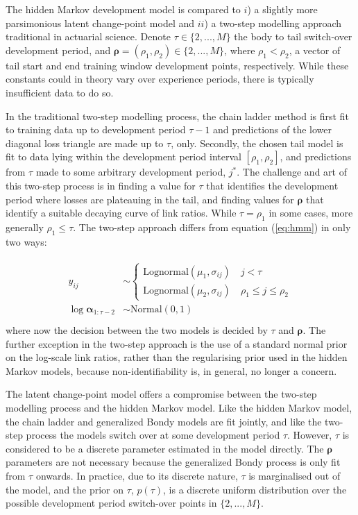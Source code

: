 The hidden Markov development model is compared to
$i$) a slightly more parsimonious latent change-point
model and $ii$) a two-step modelling approach traditional
in actuarial science.
Denote $\tau \in \{2, ..., M\}$ the body to tail
switch-over development period, and
$\bm{\rho} = (\rho_{1}, \rho_{2}) \in \{2, ..., M\}$,
where $\rho_{1} < \rho_{2}$,
a vector of tail start and end training window
development points, respectively.
While these constants could in theory vary over
experience periods, there is typically insufficient
data to do so.

In the traditional two-step modelling process,
the chain ladder
method is first fit to training data up
to development period $\tau - 1$ and
predictions of the lower diagonal loss
triangle are made up to $\tau$, only.
Secondly, the chosen tail model is fit to data
lying within the development period
interval $[\rho_{1}, \rho_{2}]$,
and predictions from $\tau$ made to 
some arbitrary development period, $j^{*}$.
The challenge and art of this two-step process
is in finding a value for $\tau$ that
identifies the development period where
losses are plateauing in the tail,
and finding values for $\bm{\rho}$ that
identify a suitable decaying curve of link ratios.
While $\tau = \rho_{1}$ in some cases,
more generally $\rho_{1} \leq \tau$.
The two-step approach differs from
equation (\ref{eq:hmm}) in only two
ways:

\begin{align}
\begin{split}
	y_{ij} &\sim 
	\begin{cases}
		\mathrm{Lognormal}(\mu_{1}, \sigma_{ij}) \quad j < \tau\\
		\mathrm{Lognormal}(\mu_{2}, \sigma_{ij}) \quad \rho_{1} \leq j \leq \rho_{2}
	\end{cases}\\
	\log \bm{\alpha}_{1:\tau - 2} &\sim \mathrm{Normal}(0, 1)\\
\end{split}
\end{align}
%
where now the decision between the two
models is decided by $\tau$ and $\bm{\rho}$.
The further exception in the two-step approach
is the use of a standard normal prior
on the log-scale link ratios, rather than the
regularising prior used in the hidden Markov models,
because non-identifiability is, in general,
no longer a concern.

The latent change-point model offers a compromise
between the two-step modelling process
and the hidden Markov model.
Like the hidden Markov model, the chain ladder
and generalized Bondy models are fit jointly, 
and like the two-step process the models
switch over at some development period
$\tau$. However,
$\tau$ is considered to be a
discrete parameter estimated
in the model directly.
The $\bm{\rho}$ parameters are not necessary
because the generalized Bondy process is
only fit from $\tau$ onwards.
In practice, due to its discrete nature,
$\tau$ is marginalised out of the model,
and the prior on $\tau$, $p(\tau)$,
is a discrete uniform distribution over the possible
development period switch-over points in $\{2,...,M\}$.

